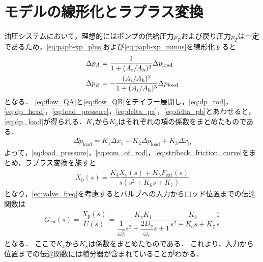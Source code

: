 \section{モデルの線形化とラプラス変換}
油圧システムにおいて，理想的にはポンプの供給圧力$p_P$および戻り圧力$p_T$は一定であるため，\eqnname\ref{eq:papb-xp_plus}および\eqnname\ref{eq:papb-xp_minus}を線形化すると
\begin{align}
    \label{eq:delta_pa}
    \Delta p_A &= \dfrac{1}{1+(A_\mathrm{r}/A_\mathrm{h})^3} \Delta p_\mathrm{load}\\
    \label{eq:delta_pb}
    \Delta p_B &= -\dfrac{(A_\mathrm{r}/A_\mathrm{h})^2}{1+(A_\mathrm{r}/A_\mathrm{h})^3} \Delta p_\mathrm{load}
\end{align}
となる．
\eqnname\ref{eq:flow_QA}と\eqnname\ref{eq:flow_QB}をテイラー展開し，\eqnname\ref{eq:dp_rod}，\eqnname\ref{eq:dp_head}，\eqnname\ref{eq:load_pressure}，\eqnname\ref{eq:delta_pa}，\eqnname\ref{eq:delta_pb}とあわせると，\eqnname\ref{eq:dp_load}が得られる．$K_1$から$K_3$はそれぞれの項の係数をまとめたものである．
\begin{align}
    \label{eq:dp_load}
    \Delta \dot{p}_\mathrm{load} = K_1 \Delta x_v +K_2 \Delta p_\mathrm{load} +K_3 \Delta \dot{x}_\mathrm{p}
\end{align}
よって，\eqnname\ref{eq:load_pressure}，\eqnname\ref{eq:eom_of_rod}，\eqnname\ref{eq:stribeck_friction_curve}をまとめ，ラプラス変換を施すと
\begin{align}
    \label{<label>}
    X_\mathrm{p}(s) = \dfrac{K_4 X_v(s)+K_5 F_\mathrm{ext}(s)}{s(s^2 + K_6s + K_7)}
\end{align}
となり，\eqnname\ref{eq:valve_freq}を考慮するとバルブへの入力からロッド位置までの伝達関数は
\begin{align}
    \label{eq:tf_Gxu}
    G_{xu}(s) = \dfrac{X_\mathrm{p}(s)}{U(s)} = \dfrac{K_vK_1}{\dfrac{1}{\omega_v^2}s^2 + \dfrac{2D_v}{\omega_v}s + 1} \dfrac{K_8}{s^2 + K_6s + K_7} \dfrac{1}{s}
\end{align}
となる．
ここで$K_4$から$K_8$は係数をまとめたものである．
これより，入力から位置までの伝達関数には積分器が含まれていることがわかる．

